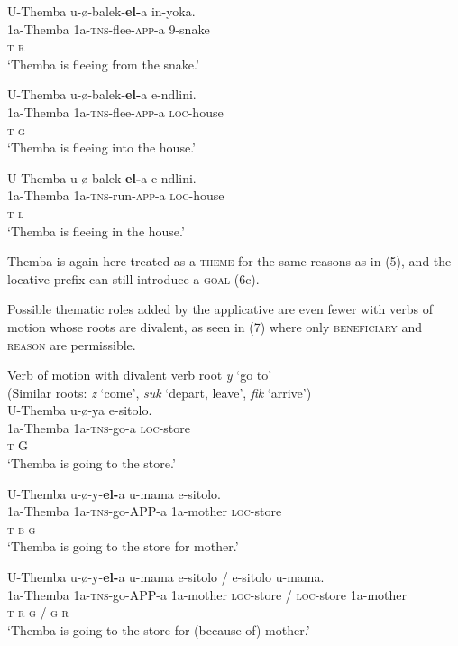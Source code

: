 \documentclass[output=paper]{langsci/langscibook}
\begin{document}
\ex
\gll U-Themba u-ø-balek-\textbf{el-}a in-yoka. \\
 1a-Themba 1a-\textsc{tns}-flee-\textsc{app}-a 9-snake\\
 \textsc{t r}\\
\glt ‘Themba is fleeing from the snake.’ 

\ex
\gll U-Themba u-ø-balek-\textbf{el-}a e-ndlini. \\
 1a-Themba 1a-\textsc{tns}-flee-\textsc{app}-a \textsc{loc}-house\\
 \textsc{t g}\\
\glt ‘Themba is fleeing into the house.’

\ex
\gll U-Themba u-ø-balek-\textbf{el-}a e-ndlini. \\
 1a-Themba 1a-\textsc{tns}-run-\textsc{app}-a \textsc{loc}-house\\
 \textsc{t l}\\
\glt ‘Themba is fleeing in the house.’
\z
\z

Themba is again here treated as a \textsc{theme} for the same reasons as in (5), and the locative prefix can still introduce a \textsc{goal }(6c).

 Possible thematic roles added by the applicative are even fewer with verbs of motion whose roots are divalent, as seen in (7) where only \textsc{beneficiary} and \textsc{reason} are permissible. 

\ea
{Verb of motion with divalent verb root \textit{y }‘go to’ }\\
 (Similar roots: \textit{z} ‘come’, \textit{suk} ‘depart, leave’, \textit{fik} ‘arrive’)\\
\ea
\gll U-Themba u-ø-ya e-sitolo. \\
 1a-Themba 1a-\textsc{tns}-go-a \textsc{loc}-store\\
 \textsc{t }G\\
\glt ‘Themba is going to the store.’

\ex
\gll U-Themba u-ø-y-\textbf{el-}a{\rmfnm} u-mama e-sitolo. \\
 1a-Themba 1a-\textsc{tns}-go-APP-a 1a-mother \textsc{loc}-store\\
 \textsc{t b g}\\
\glt ‘Themba is going to the store for mother.’

\ex
\gll U-Themba u-ø-y-\textbf{el-}a u-mama e-sitolo / e-sitolo u-mama.\\
 1a-Themba 1a-\textsc{tns}-go-APP-a 1a-mother \textsc{loc}-store / \textsc{loc}-store 1a-mother\\
 \textsc{t r g / g r}\\
\glt ‘Themba is going to the store for (because of) mother.’
\end{document}
